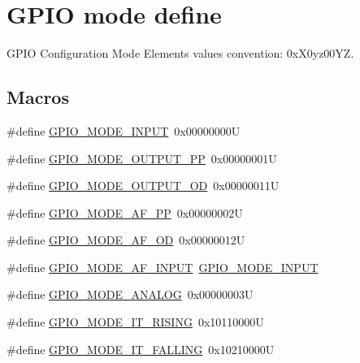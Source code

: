 \hypertarget{group___g_p_i_o__mode__define}{}\section{G\+P\+IO mode define}
\label{group___g_p_i_o__mode__define}


G\+P\+IO Configuration Mode Elements values convention\+: 0x\+X0yz00\+YZ.  


\subsection*{Macros}
\begin{DoxyCompactItemize}
\item 
\#define \hyperlink{group___g_p_i_o__mode__define_gaf40bec3146810028a84b628d37d3b391}{G\+P\+I\+O\+\_\+\+M\+O\+D\+E\+\_\+\+I\+N\+P\+UT}~0x00000000U
\item 
\#define \hyperlink{group___g_p_i_o__mode__define_ga1013838a64cec2f8c88f079c449d1982}{G\+P\+I\+O\+\_\+\+M\+O\+D\+E\+\_\+\+O\+U\+T\+P\+U\+T\+\_\+\+PP}~0x00000001U
\item 
\#define \hyperlink{group___g_p_i_o__mode__define_ga2f91757829f6e9505ec386b840941929}{G\+P\+I\+O\+\_\+\+M\+O\+D\+E\+\_\+\+O\+U\+T\+P\+U\+T\+\_\+\+OD}~0x00000011U
\item 
\#define \hyperlink{group___g_p_i_o__mode__define_ga526c72c5264316fc05c775b6cad4aa6a}{G\+P\+I\+O\+\_\+\+M\+O\+D\+E\+\_\+\+A\+F\+\_\+\+PP}~0x00000002U
\item 
\#define \hyperlink{group___g_p_i_o__mode__define_ga282b9fd37c8ef31daba314ffae6bf023}{G\+P\+I\+O\+\_\+\+M\+O\+D\+E\+\_\+\+A\+F\+\_\+\+OD}~0x00000012U
\item 
\#define \hyperlink{group___g_p_i_o__mode__define_gadb81109590b66d8e48076820064921b1}{G\+P\+I\+O\+\_\+\+M\+O\+D\+E\+\_\+\+A\+F\+\_\+\+I\+N\+P\+UT}~\hyperlink{group___g_p_i_o__mode__define_gaf40bec3146810028a84b628d37d3b391}{G\+P\+I\+O\+\_\+\+M\+O\+D\+E\+\_\+\+I\+N\+P\+UT}
\item 
\#define \hyperlink{group___g_p_i_o__mode__define_ga7a04f9ab65ad572ad20791a35009220c}{G\+P\+I\+O\+\_\+\+M\+O\+D\+E\+\_\+\+A\+N\+A\+L\+OG}~0x00000003U
\item 
\#define \hyperlink{group___g_p_i_o__mode__define_ga088659562e68426d9a72821ea4fd8d50}{G\+P\+I\+O\+\_\+\+M\+O\+D\+E\+\_\+\+I\+T\+\_\+\+R\+I\+S\+I\+NG}~0x10110000U
\item 
\#define \hyperlink{group___g_p_i_o__mode__define_gaa166210a6da3ac7e8d7504702520e522}{G\+P\+I\+O\+\_\+\+M\+O\+D\+E\+\_\+\+I\+T\+\_\+\+F\+A\+L\+L\+I\+NG}~0x10210000U

\end{DoxyCompactItemize}
